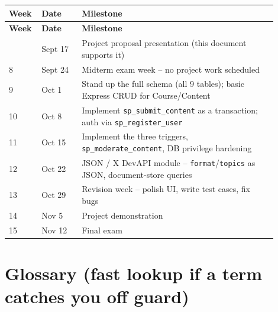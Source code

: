 \documentclass[11pt]{article}
\begin{document}
\bigskip
\begin{longtable}{@{}p{0.08\linewidth} p{0.14\linewidth} p{0.68\linewidth}@{}}
\toprule
\textbf{Week} & \textbf{Date} & \textbf{Milestone} \\
\midrule
\endfirsthead
\toprule
\textbf{Week} & \textbf{Date} & \textbf{Milestone} \\
\midrule
\endhead
\bottomrule
\endfoot
7 & Sept 17 & Project proposal presentation (this document supports it) \\[4pt]
8 & Sept 24 & Midterm exam week -- no project work scheduled \\[4pt]
9 & Oct 1 & Stand up the full schema (all 9 tables); basic Express CRUD for Course/Content \\[4pt]
10 & Oct 8 & Implement \texttt{sp\_submit\_content} as a transaction; auth via \texttt{sp\_register\_user} \\[4pt]
11 & Oct 15 & Implement the three triggers, \texttt{sp\_moderate\_content}, DB privilege hardening \\[4pt]
12 & Oct 22 & JSON / X DevAPI module -- \texttt{format}/\texttt{topics} as JSON, document-store queries \\[4pt]
13 & Oct 29 & Revision week -- polish UI, write test cases, fix bugs \\[4pt]
14 & Nov 5 & Project demonstration \\[4pt]
15 & Nov 12 & Final exam \\
\end{longtable}

\section{Glossary (fast lookup if a term catches you off guard)}
\end{document}
